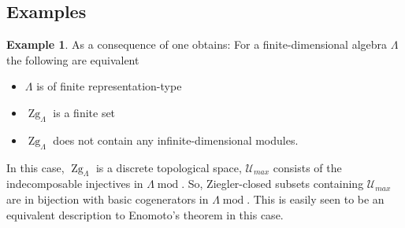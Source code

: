 \documentclass[11pt,a4paper]{amsart}
\theoremstyle{plain}
\theoremstyle{definition}
\newtheorem{exa}[thm]{Example}
\DeclareMathOperator{\modu}{mod}
\newcommand{\La}{\Lambda}
\newcommand{\mcU}{\mathcal{U}}
\DeclareMathOperator{\Zg}{Zg}
\begin{document}
\subsection{Examples}
\begin{exa}
As a consequence of \cite[Cor. 5.3.36, Cor. 5.3.37, Thm 5.1.12]{Pr} one obtains: For a finite-dimensional algebra $\La$ the following are equivalent
\begin{itemize}
    \item[(1)] $\La$ is of finite representation-type
    \item[(2)] $\Zg_{\La}$ is a finite set
    \item[(3)] $\Zg_{\La}$ does not contain any infinite-dimensional modules. 
\end{itemize}
In this case, $\Zg_{\La}$ is a discrete topological space, $\mcU_{max}$ consists of the indecomposable injectives in $\La\modu$. 
So, Ziegler-closed subsets containing $\mcU_{max}$ are in bijection with basic cogenerators in $\La\modu$. This is easily seen to be an equivalent description to Enomoto's theorem in this case. 
\end{exa}
\end{document}
